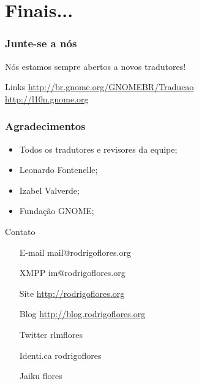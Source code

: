 \documentclass{beamer}
\begin{document}
\section{Finais...}

\begin{frame}
  \frametitle{Junte-se a nós}
  Nós estamos sempre abertos a novos tradutores!
  \begin{block}{Links}
     \url{http://br.gnome.org/GNOMEBR/Traducao}\\
     \url{http://l10n.gnome.org}
  \end{block}
\end{frame}


\begin{frame}
  \frametitle{Agradecimentos}

  \begin{itemize}[<+->]
    \item Todos os tradutores e revisores da equipe;
    \item Leonardo Fontenelle;
    \item Izabel Valverde;
    \item Fundação GNOME;     
  \end{itemize}
\end{frame}

\begin{frame}
    \begin{block}{Contato}     
    \begin{itemize}
            \centering
            \item[E-mail] mail@rodrigoflores.org 
            \item[XMPP]  im@rodrigoflores.org        
            \item[Site]  \url{http://rodrigoflores.org}
            \item[Blog]  \url{http://blog.rodrigoflores.org}        
            \item[Twitter] rlmflores 
            \item[Identi.ca] rodrigoflores        
            \item[Jaiku] flores        
        \end{itemize}
    \end{block}
\end{frame}
\end{document}
